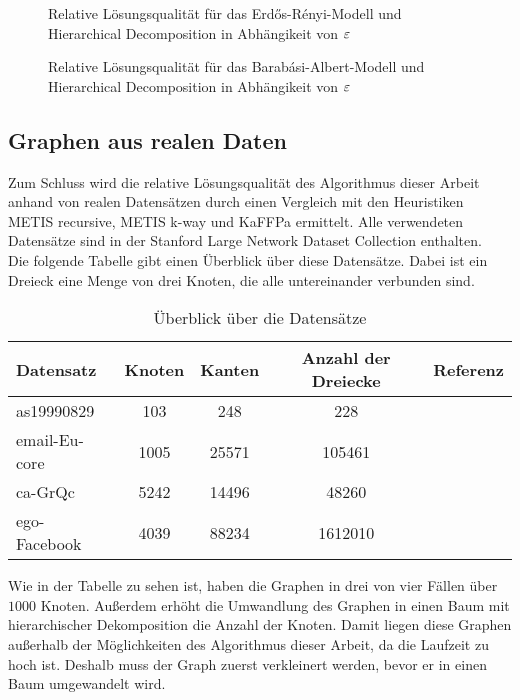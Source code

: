 \begin{figure}[H]
    \centering
    
    \caption{Relative Lösungsqualität für das Erdős-Rényi-Modell und Hierarchical Decomposition in Abhängikeit von $\varepsilon$\label{fig:edgeprobhdecompimb}}
\end{figure}

\begin{figure}[H]
    \centering
    
    \caption{Relative Lösungsqualität für das Barabási-Albert-Modell und Hierarchical Decomposition in Abhängikeit von $\varepsilon$\label{fig:prefattachhdecompimb}}
\end{figure}

\subsection{Graphen aus realen Daten}
Zum Schluss wird die relative Lösungsqualität des Algorithmus dieser Arbeit anhand von realen Datensätzen durch einen Vergleich mit den Heuristiken METIS recursive, METIS k-way und KaFFPa ermittelt.
Alle verwendeten Datensätze sind in der Stanford Large Network Dataset Collection enthalten.~\cite{LK14}
Die folgende Tabelle gibt einen Überblick über diese Datensätze.
Dabei ist ein Dreieck eine Menge von drei Knoten, die alle untereinander verbunden sind.

\begin{table}[H]
    \centering
    \begin{tabular}{lcccc}
        \toprule
        Datensatz & Knoten & Kanten & Anzahl der Dreiecke & Referenz \\
        \midrule
        as19990829 & 103 & 248 & 228 & \cite{LKF05} \\
        email-Eu-core & 1005 & 25571 & 105461 & \cite{LKF07} \\
        ca-GrQc & 5242 & 14496 & 48260 & \cite{LKF07} \\
        ego-Facebook & 4039 & 88234 & 1612010 & \cite{ML14} \\
        \bottomrule
    \end{tabular}
    \caption{Überblick über die Datensätze}
\end{table}

Wie in der Tabelle zu sehen ist, haben die Graphen in drei von vier Fällen über $1000$ Knoten.
Außerdem erhöht die Umwandlung des Graphen in einen Baum mit hierarchischer Dekomposition die Anzahl der Knoten. 
Damit liegen diese Graphen außerhalb der Möglichkeiten des Algorithmus dieser Arbeit, da die Laufzeit zu hoch ist.
Deshalb muss der Graph zuerst verkleinert werden, bevor er in einen Baum umgewandelt wird.

